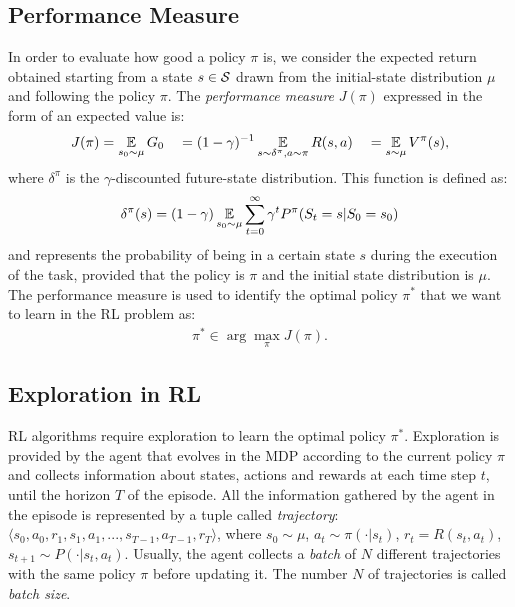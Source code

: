 \subsection{Performance Measure}
In order to evaluate how good a policy $\pi$ is, we consider the expected return obtained starting from a state $s \in \mathcal{S}$ drawn from the initial-state distribution $\mu$ and following the policy $\pi$. The \emph{performance measure} $J(\pi)$ expressed in the form of an expected value is:
\begin{align} {J(\pi) = \operatorname*{\mathbb{E}}_{s_0\sim\mu}{G_0} \quad = (1 - \gamma)^{-1}\operatorname*{\mathbb{E}}_{s\sim\delta^{\pi}, a \sim \pi}R(s,a)} \quad = \operatorname*{\mathbb{E}}_{s\sim\mu}V^{\pi}(s), \end{align}
where $\delta^{\pi}$ is the $\gamma$-discounted future-state distribution. This function is defined as:
\begin{align} \delta^{\pi}(s) = (1 - \gamma)\operatorname*{\mathbb{E}}_{s_{0}\sim\mu}\sum_{t=0}^{\infty}\gamma^t P^{\pi}(S_t = s|S_0=s_0) \end{align}
and represents the probability of being in a certain state $s$ during the execution of the task, provided that the policy is $\pi$ and the initial state distribution is $\mu$.\\
\newline
The performance measure is used to identify the optimal policy $\pi^{*}$ that we want to learn in the \ac{RL} problem as:
\begin{align} \pi^{*} \in \arg \max_{\pi} J(\pi). \end{align}

\subsection{Exploration in \ac{RL}}
\ac{RL} algorithms require exploration to learn the optimal policy $\pi^{*}$. Exploration is provided by the agent that evolves in the \ac{MDP} according to the current policy $\pi$ and collects information about states, actions and rewards at each time step $t$, until the horizon $T$ of the episode. All the information gathered by the agent in the episode is represented by a tuple called \emph{trajectory}: $\langle s_0, a_0, r_1, s_1, a_1, ..., s_{T-1}, a_{T-1}, r_{T} \rangle$, where $s_{0} \sim \mu$, $a_{t} \sim \pi(\cdot|s_{t})$, $r_{t} = R(s_{t}, a_{t})$, $s_{t+1} \sim P(\cdot|s_{t}, a_{t})$. Usually, the agent collects a \emph{batch} of $N$ different trajectories with the same policy $\pi$ before updating it. The number $N$ of trajectories is called \emph{batch size}.

